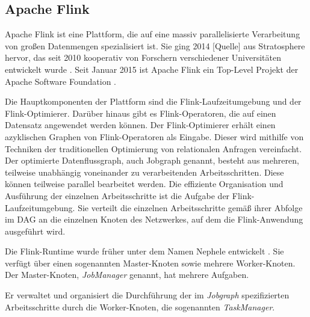 \subsection{Apache Flink}

Apache Flink ist eine Plattform, die auf eine massiv parallelisierte Verarbeitung von großen Datenmengen spezialisiert ist. Sie ging 2014 [Quelle] aus Stratosphere hervor, das seit 2010 kooperativ von Forschern verschiedener Universitäten entwickelt wurde \cite{Battre2010, Alexandrov2014}. Seit Januar 2015 ist Apache Flink ein Top-Level Projekt der Apache Software Foundation \cite{ApacheFlinkBlogEntry}. 

Die Hauptkomponenten der Plattform sind die Flink-Laufzeitumgebung und der Flink-Optimierer. Darüber hinaus gibt es Flink-Operatoren, die auf einen Datensatz angewendet werden können. Der Flink-Optimierer erhält einen azyklischen Graphen von Flink-Operatoren als Eingabe. Dieser wird mithilfe von Techniken der traditionellen Optimierung von relationalen Anfragen vereinfacht. Der optimierte Datenflussgraph, auch Jobgraph genannt, besteht aus mehreren, teilweise unabhängig voneinander zu verarbeitenden Arbeitsschritten. Diese können teilweise parallel bearbeitet werden. Die effiziente Organisation und Ausführung der einzelnen Arbeitsschritte ist die Aufgabe der Flink-Laufzeitumgebung. Sie verteilt die einzelnen Arbeitsschritte gemäß ihrer Abfolge im DAG an die einzelnen Knoten des Netzwerkes, auf dem die Flink-Anwendung ausgeführt wird.

Die Flink-Runtime wurde früher unter dem Namen Nephele entwickelt \cite{Warneke2009}. Sie verfügt über einen sogenannten Master-Knoten sowie mehrere Worker-Knoten. Der Master-Knoten, \textit{JobManager} genannt, hat mehrere Aufgaben. %

Er verwaltet und organisiert die Durchführung der im \textit{Jobgraph} spezifizierten Arbeitsschritte durch die Worker-Knoten, die sogenannten \textit{TaskManager}. 

